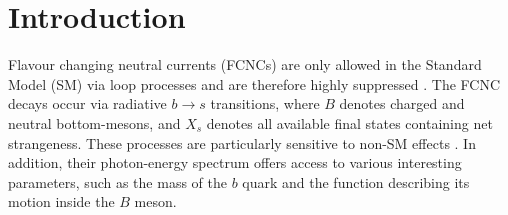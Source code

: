 \section{Introduction}

Flavour changing neutral currents (FCNCs) are only allowed in the Standard Model (SM) via loop processes and are therefore highly suppressed \cite{Misiak:2020vlo}. The \BtoXsgamma FCNC decays occur via radiative $b\rightarrow s$ transitions, where $B$ denotes charged and neutral bottom-mesons, and $X_s$ denotes all available final states containing net strangeness. These processes are particularly sensitive to non-SM effects \cite{Misiak:2017bgg}.
In addition, their photon-energy spectrum offers access to various interesting parameters, such as the mass of the $b$ quark and the function describing its motion inside the $B$ meson. \cite{RevModPhys.88.035008, simba}


